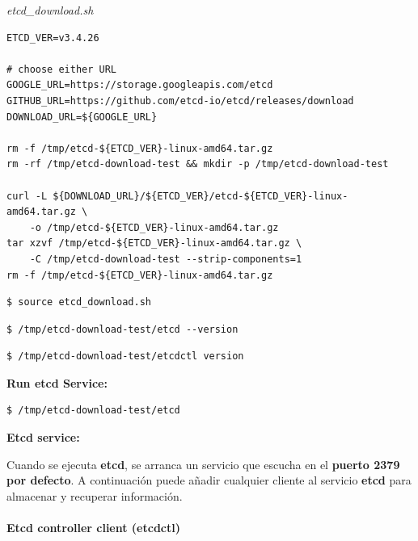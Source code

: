 \documentclass{article}
\newenvironment{codetemplate}[1][]{%
  \mybasecolorbox[#1]
  \itshape
}{%
  \endmybasecolorbox
}
\begin{document}
\begin{codetemplate}{etcd\_download.sh}
\begin{verbatim}
ETCD_VER=v3.4.26

# choose either URL
GOOGLE_URL=https://storage.googleapis.com/etcd
GITHUB_URL=https://github.com/etcd-io/etcd/releases/download
DOWNLOAD_URL=${GOOGLE_URL}

rm -f /tmp/etcd-${ETCD_VER}-linux-amd64.tar.gz
rm -rf /tmp/etcd-download-test && mkdir -p /tmp/etcd-download-test

curl -L ${DOWNLOAD_URL}/${ETCD_VER}/etcd-${ETCD_VER}-linux-amd64.tar.gz \ 
    -o /tmp/etcd-${ETCD_VER}-linux-amd64.tar.gz
tar xzvf /tmp/etcd-${ETCD_VER}-linux-amd64.tar.gz \
    -C /tmp/etcd-download-test --strip-components=1
rm -f /tmp/etcd-${ETCD_VER}-linux-amd64.tar.gz
\end{verbatim}
\end{codetemplate}

\begin{codetemplate}{}
\begin{verbatim}
$ source etcd_download.sh
\end{verbatim}
\end{codetemplate}

\begin{codetemplate}{}
\begin{verbatim}
$ /tmp/etcd-download-test/etcd --version
\end{verbatim}
\end{codetemplate}

\begin{codetemplate}{}
\begin{verbatim}
$ /tmp/etcd-download-test/etcdctl version
\end{verbatim}
\end{codetemplate}

\textbf{Run etcd Service:}
\begin{codetemplate}{}
\begin{verbatim}
$ /tmp/etcd-download-test/etcd
\end{verbatim}
\end{codetemplate}

\textbf{Etcd service:}

Cuando se ejecuta \textbf{etcd}, se arranca un servicio que escucha en el \textbf{puerto 2379 por defecto}. A continuación puede añadir cualquier cliente al servicio \textbf{etcd} para almacenar y recuperar información.

\paragraph{Etcd controller client (etcdctl)}
\end{document}
